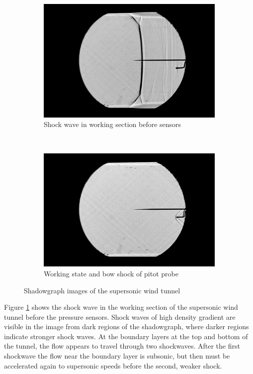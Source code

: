 \documentclass[8pt]{article}
\begin{document}
\begin{figure}[H]
    \centering
    \begin{subfigure}[t]{0.48\textwidth}
        \centering
        \includegraphics[width=1\textwidth]{starting_shock.jpg}
        \caption{Shock wave in working section before sensors}
        \label{fig:figure6}
    \end{subfigure}
    ~
    \begin{subfigure}[t]{0.48\textwidth}
        \centering
        \includegraphics[width=1\textwidth]{working_state.jpg}
        \caption{Working state and bow shock of pitot probe}
        \label{fig:figure7}
    \end{subfigure}
    \caption{Shadowgraph images of the supersonic wind tunnel}
\end{figure}

Figure \ref{fig:figure6} shows the shock wave in the working section of the supersonic wind tunnel before the pressure sensors.
Shock waves of high density gradient are visible in the image from dark regions of the shadowgraph, where darker regions indicate stronger shock waves.
At the boundary layers at the top and bottom of the tunnel, the flow appears to travel through two shockwaves.
After the first shockwave the flow near the boundary layer is subsonic, but then must be accelerated again to supersonic speeds before the second, weaker shock.
\end{document}
